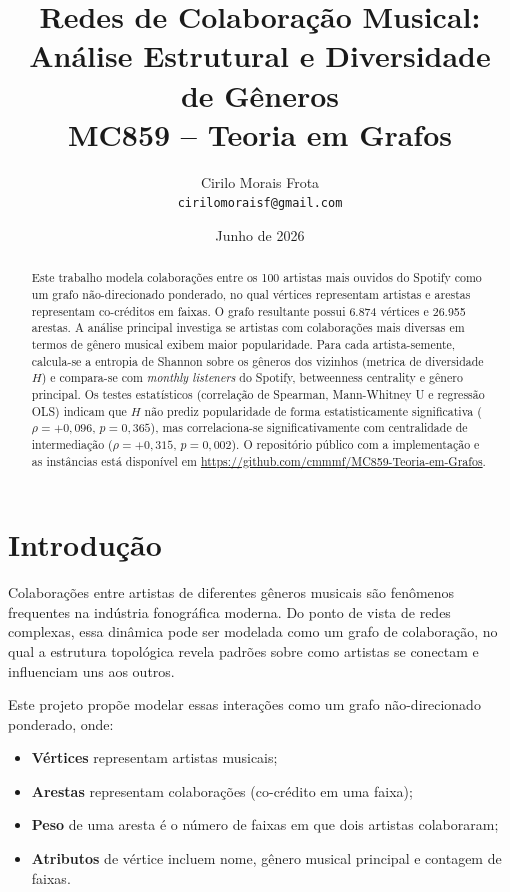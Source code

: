 \documentclass[12pt,a4paper]{article}
\title{\textbf{Redes de Colaboração Musical:\\Análise Estrutural e Diversidade de Gêneros}\\[0.5em]
\large MC859 -- Teoria em Grafos}
\author{Cirilo Morais Frota \\ \texttt{cirilomoraisf@gmail.com}}
\date{Junho de 2026}
\begin{document}
\maketitle

\begin{abstract}
Este trabalho modela colaborações entre os 100 artistas mais ouvidos do Spotify como um grafo não-direcionado ponderado, no qual vértices representam artistas e arestas representam co-créditos em faixas. O grafo resultante possui 6.874 vértices e 26.955 arestas. A análise principal investiga se artistas com colaborações mais diversas em termos de gênero musical exibem maior popularidade. Para cada artista-semente, calcula-se a entropia de Shannon sobre os gêneros dos vizinhos (metrica de diversidade $H$) e compara-se com \emph{monthly listeners} do Spotify, betweenness centrality e gênero principal. Os testes estatísticos (correlação de Spearman, Mann-Whitney U e regressão OLS) indicam que $H$ não prediz popularidade de forma estatisticamente significativa ($\rho = +0{,}096$, $p = 0{,}365$), mas correlaciona-se significativamente com centralidade de intermediação ($\rho = +0{,}315$, $p = 0{,}002$). O repositório público com a implementação e as instâncias está disponível em \url{https://github.com/cmmmf/MC859-Teoria-em-Grafos}.
\end{abstract}

\tableofcontents
\newpage

\section{Introdução}

Colaborações entre artistas de diferentes gêneros musicais são fenômenos frequentes na indústria fonográfica moderna. Do ponto de vista de redes complexas, essa dinâmica pode ser modelada como um grafo de colaboração, no qual a estrutura topológica revela padrões sobre como artistas se conectam e influenciam uns aos outros.

Este projeto propõe modelar essas interações como um grafo não-direcionado ponderado, onde:
\begin{itemize}
    \item \textbf{Vértices} representam artistas musicais;
    \item \textbf{Arestas} representam colaborações (co-crédito em uma faixa);
    \item \textbf{Peso} de uma aresta é o número de faixas em que dois artistas colaboraram;
    \item \textbf{Atributos} de vértice incluem nome, gênero musical principal e contagem de faixas.
\end{itemize}
\end{document}
